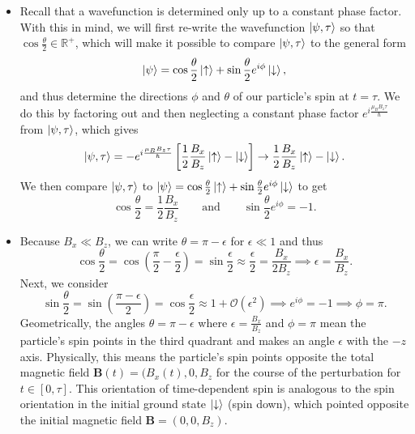 \documentclass[11pt, a4paper]{article}
\newcommand{\eqtext}[1]{\qquad \text{#1} \qquad}
\renewcommand{\vec}[1]{\bm{#1}} %
\newcommand{\p}{\psi}  %
\newcommand{\ua}{\uparrow}  %
\newcommand{\da}{\downarrow}  %
\begin{document}
\begin{itemize}
	\item Recall that a wavefunction is determined only up to a constant phase factor. With this in mind, we will first re-write the wavefunction $ \ket{\p, \tau} $ so that $ \cos \frac{\theta}{2} \in \mathbb{R}^{+} $, which will make it possible to compare $ \ket{\p, \tau} $ to the general form
	\begin{equation*}
		\ket{\p} = \cos \frac{\theta}{2}\ket{\ua} + \sin \frac{\theta}{2}e^{i\phi}\ket{\da},
	\end{equation*}
	and thus determine the directions $ \phi $ and $ \theta $ of our particle's spin at $ t = \tau $. We do this by factoring out and then neglecting a constant phase factor $ e^{i\frac{\mu_{B}B_{z}\tau}{\hbar}} $ from $ \ket{\p, \tau} $, which gives
	\begin{equation*}
		\ket{\p, \tau} = - e^{i\frac{\mu_{B}B_{z}\tau}{\hbar}}\left[\frac{1}{2}\frac{B_{x}}{B_{z}}\ket{\ua} - \ket{\da}\right] \to \frac{1}{2}\frac{B_{x}}{B_{z}}\ket{\ua} - \ket{\da}.
	\end{equation*}
	We then compare $ \ket{\p, \tau} $ to $ \ket{\p} = \cos \frac{\theta}{2}\ket{\ua} + \sin \frac{\theta}{2}e^{i\phi}\ket{\da} $ to get
	\begin{equation*}
		\cos \frac{\theta}{2} = \frac{1}{2}\frac{B_{x}}{B_{z}} \eqtext{and} \sin \frac{\theta}{2}e^{i\phi} = - 1.
	\end{equation*}
	
	\item Because $ B_{x} \ll B_{z} $, we can write $ \theta = \pi - \epsilon $ for $ \epsilon \ll 1 $ and thus
	\begin{equation*}
		\cos \frac{\theta}{2} = \cos \left(\frac{\pi}{2} - \frac{\epsilon}{2}\right) = \sin \frac{\epsilon}{2} \approx \frac{\epsilon}{2} = \frac{B_{x}}{2B_{z}} \implies \epsilon = \frac{B_{x}}{B_{z}}.
	\end{equation*}
	Next, we consider
	\begin{equation*}
		\sin \frac{\theta}{2} = \sin \left(\frac{\pi - \epsilon}{2}\right) = \cos \frac{\epsilon}{2} \approx 1 + \mathcal{O}(\epsilon^{2}) \implies e^{i\phi} = -1 \implies \phi = \pi.
	\end{equation*} 
    Geometrically, the angles $ \theta = \pi - \epsilon $ where $ \epsilon = \frac{B_{x}}{B_{z}}  $ and $ \phi = \pi $ mean the particle's spin points in the third quadrant and makes an angle $ \epsilon $ with the $ -z $ axis. Physically, this means the particle's spin points opposite the total magnetic field $ \vec{B}(t) = (B_{x}(t), 0, B_{z} $ for the course of the perturbation for $ t \in [0, \tau] $. This orientation of time-dependent spin is analogous to the spin orientation in the initial ground state $ \ket{\da} $ (spin down), which pointed opposite the initial magnetic field $ \vec{B} = (0, 0, B_{z}) $.  

\end{itemize}
\end{document}
